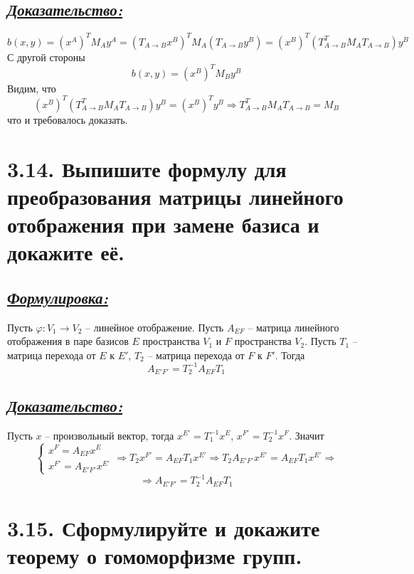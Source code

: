 \documentclass{article}
\begin{document}
\subsection*{\Large \underline{\textit{Доказательство: }}}
$$b(x, y) = (x^{A})^T M_A y^A = (T_{A \rightarrow B}x^{B})^T M_A (T_{A \rightarrow B} y^B) = 
(x^{B})^T (T_{A \rightarrow B}^T M_A T_{A \rightarrow B}) y^B$$
С другой стороны 
$$b(x, y) = (x^{B})^T M_B y^B$$
Видим, что 
$$
(x^{B})^T (T_{A \rightarrow B}^T M_A T_{A \rightarrow B}) y^B = (x^{B})^T  y^B \Rightarrow
T_{A \rightarrow B}^T M_A T_{A \rightarrow B} = M_B
$$
что и требовалось доказать.

\section*{\LARGE 3.14. Выпишите формулу для преобразования матрицы линейного отображения при замене базиса и докажите её. }
\subsection*{\Large \underline{\textit{Формулировка: }}}
Пусть $\varphi : V_1 \rightarrow V_2$ -- линейное отображение. Пусть $A_{EF}$ -- матрица линейного отображения в паре базисов $E$ пространства $V_1$ и $F$ пространства $V_2$. Пусть $T_1$ -- матрица перехода от $E$ к $E'$, $T_2$ --  матрица перехода от $F$ к $F'$. Тогда 
$$
A_{E'F'} = T_2^{-1}A_{EF}T_1
$$

\subsection*{\Large \underline{\textit{Доказательство: }}}
Пусть $x$ -- произвольный вектор, тогда $x^{E'} = T_1^{-1} x^E$, $x^{F'} = T_2^{-1} x^F$. Значит $$
\begin{cases}
x^{F} = A_{EF} x^{E} \\
x^{F'} = A_{E'F'} x^{E'}
\end{cases}
\Rightarrow
T_2 x^{F'} = A_{EF} T_1 x^{E'}
\Rightarrow
T_2 A_{E'F'} x^{E'} = A_{EF} T_1 x^{E'}
\Rightarrow
$$
$$
\Rightarrow
A_{E'F'} = T_2^{-1} A_{EF} T_1
$$

\section*{\LARGE 3.15. Сформулируйте и докажите теорему о гомоморфизме групп. }
\end{document}
